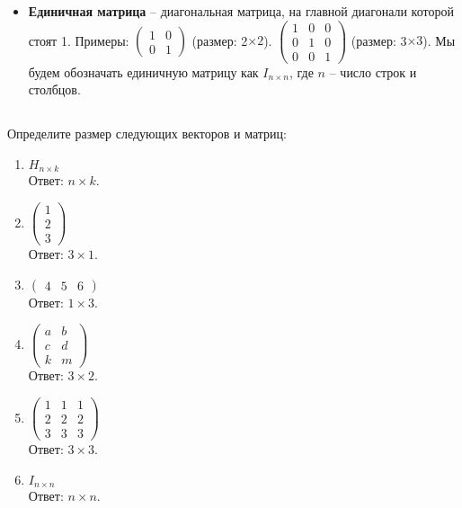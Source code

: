 \documentclass[11pt, a4paper]{extarticle}
\begin{document}
\begin{itemize}
	\item \textbf{Единичная матрица} – диагональная матрица, на главной диагонали которой стоят 1. Примеры: $\begin{pmatrix}
	1 & 0 \\
	0 & 1
	\end{pmatrix}$ (размер: 2$\times2$). $\begin{pmatrix}
	1 & 0 & 0 \\
	0 & 1 & 0 \\
	0 & 0 & 1
	\end{pmatrix}$ (размер: 3$\times3$). Мы будем обозначать единичную матрицу как $I_{n\times n}$, где $n$ – число строк и столбцов.
	
\end{itemize}

\subsection{}
Определите размер следующих векторов и матриц:
\begin{multicols}{3}
	\begin{enumerate}[label=\alph*)]
		\item $H_{n\times k}$ \\ {\small Ответ: $n\times k$.}
		\item $\begin{pmatrix}
		1 \\ 2 \\ 3
		\end{pmatrix}$ \\ {\small Ответ: $3\times 1$.}
		\item $\begin{pmatrix}
		4 & 5 & 6
		\end{pmatrix}$ \\ {\small Ответ: $1\times 3$.}
		
		\item $\begin{pmatrix}
			a & b \\
			c & d \\
			k & m
		\end{pmatrix}$ \\ {\small Ответ: $3\times 2$.}
		
		\item $\begin{pmatrix}
			1 & 1 & 1 \\
			2 & 2 & 2 \\
			3 & 3 & 3
		\end{pmatrix}$ \\ {\small Ответ: $3\times 3$.}
		
		\item $I_{n\times n}$ \\ {\small Ответ: $n\times n$.}
	\end{enumerate}
\end{multicols}
\end{document}
